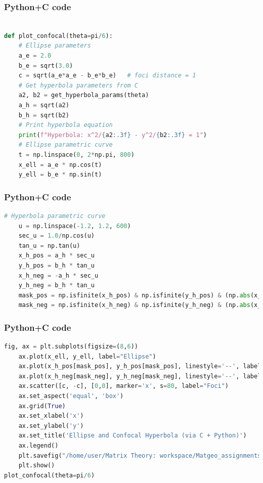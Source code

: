 \documentclass{beamer}
\begin{document}
\begin{frame}[fragile]
    \frametitle{Python+C code}

    \begin{lstlisting}[language=Python]
    
def plot_confocal(theta=pi/6):
    # Ellipse parameters
    a_e = 2.0
    b_e = sqrt(3.0)
    c = sqrt(a_e*a_e - b_e*b_e)   # foci distance = 1
    # Get hyperbola parameters from C
    a2, b2 = get_hyperbola_params(theta)
    a_h = sqrt(a2)
    b_h = sqrt(b2)
    # Print hyperbola equation
    print(f"Hyperbola: x^2/{a2:.3f} - y^2/{b2:.3f} = 1")
    # Ellipse parametric curve
    t = np.linspace(0, 2*np.pi, 800)
    x_ell = a_e * np.cos(t)
    y_ell = b_e * np.sin(t)


    \end{lstlisting}
\end{frame}

\begin{frame}[fragile]
    \frametitle{Python+C code}

    \begin{lstlisting}[language=Python]
    # Hyperbola parametric curve
    u = np.linspace(-1.2, 1.2, 600)
    sec_u = 1.0/np.cos(u)
    tan_u = np.tan(u)
    x_h_pos = a_h * sec_u
    y_h_pos = b_h * tan_u
    x_h_neg = -a_h * sec_u
    y_h_neg = b_h * tan_u
    mask_pos = np.isfinite(x_h_pos) & np.isfinite(y_h_pos) & (np.abs(x_h_pos)<50) & (np.abs(y_h_pos)<50)
    mask_neg = np.isfinite(x_h_neg) & np.isfinite(y_h_neg) & (np.abs(x_h_neg)<50) & (np.abs(y_h_neg)<50)

    \end{lstlisting}
\end{frame}

\begin{frame}[fragile]
    \frametitle{Python+C code}

    \begin{lstlisting}[language=Python]
    fig, ax = plt.subplots(figsize=(8,6))
    ax.plot(x_ell, y_ell, label="Ellipse")
    ax.plot(x_h_pos[mask_pos], y_h_pos[mask_pos], linestyle='--', label="Hyperbola (right branch)")
    ax.plot(x_h_neg[mask_neg], y_h_neg[mask_neg], linestyle='--', label="Hyperbola (left branch)")
    ax.scatter([c, -c], [0,0], marker='x', s=80, label="Foci")
    ax.set_aspect('equal', 'box')
    ax.grid(True)
    ax.set_xlabel('x')
    ax.set_ylabel('y')
    ax.set_title('Ellipse and Confocal Hyperbola (via C + Python)')
    ax.legend()
    plt.savefig("/home/user/Matrix Theory: workspace/Matgeo_assignments/8.4.29/figs/figure_1.png")
    plt.show()
plot_confocal(theta=pi/6)
    \end{lstlisting}
\end{frame}
\end{document}
